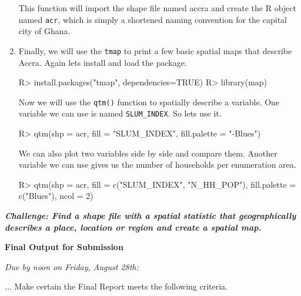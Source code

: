 \documentclass{article}
\newenvironment{Schunk}{}{}
\newcommand{\code}[1]{\texttt{#1}}
\newcommand{\pkg}[1]{\mbox{\texttt{#1}}}
\newcommand{\proglang}[1]{\textsf{#1}}
\begin{document}
\begin{enumerate}[leftmargin=15mm]
This function will import the shape file named accra and create the \proglang{R} object named \code{acr}, which is simply a shortened naming convention for the capital city of Ghana.

\item Finally, we will use the \pkg{tmap} to print a few basic spatial maps that describe Accra.  Again lets install and load the package.

\begin{Schunk}
\begin{Sinput}
R> install.packages("tmap", dependencies=TRUE)
R> library(map)
\end{Sinput}
\end{Schunk}

Now we will use the \code{qtm()} function to spatially describe a variable.  One variable we can use is named \code{SLUM\_INDEX}.  So lets use it.

\begin{Schunk}
\begin{Sinput}
R> qtm(shp = acr, fill = "SLUM_INDEX", fill.palette = "-Blues")
\end{Sinput}
\end{Schunk}

We can also plot two variables side by side and compare them.  Another variable we can use gives us the number of households per enumeration area.

\begin{Schunk}
\begin{Sinput}
R> qtm(shp = acr, fill = c("SLUM_INDEX", "N_HH_POP"), fill.palette = c("Blues"), ncol = 2)
\end{Sinput}
\end{Schunk}

\end{enumerate}

\item \textbf{\textit{Challenge: Find a shape file with a spatial statistic that geographically describes a place, location or region and create a spatial map.}}


\setlength{\leftskip}{0cm}

\large{\textbf{Final Output for Submission}}

\vspace{4mm}
\setlength{\leftskip}{1cm}
\textit{Due by noon on Friday, August 28th:}
\vspace{2mm}

...  Make certain the Final Report meets the following criteria.
\end{document}
